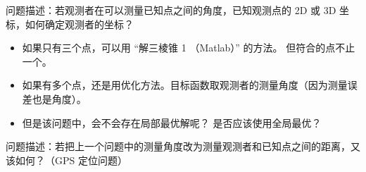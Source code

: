 
\begin{issues}
\issueDraft
\end{issues}

问题描述：若观测者在可以测量已知点之间的角度，已知观测点的 2D 或 3D 坐标，如何确定观测者的坐标？

\begin{itemize}
\item 如果只有三个点，可以用 “解三棱锥 1 （Matlab）” 的方法。 但符合的点不止一个。
\item 如果有多个点，还是用优化方法。目标函数取观测者的测量角度（因为测量误差也是角度）。
\item 但是该问题中，会不会存在局部最优解呢？ 是否应该使用全局最优？
\end{itemize}

问题描述：若把上一个问题中的测量角度改为测量观测者和已知点之间的距离，又该如何？（GPS 定位问题）

